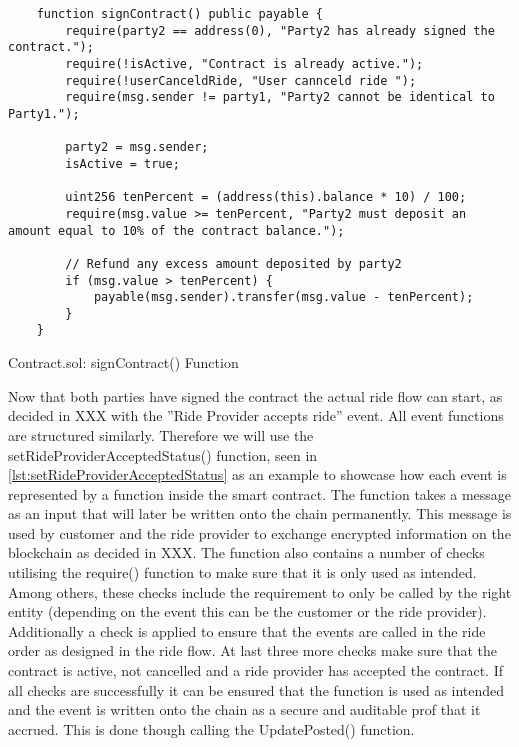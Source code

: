 \begin{Listing}
\begin{lstlisting}
    function signContract() public payable {
        require(party2 == address(0), "Party2 has already signed the contract.");
        require(!isActive, "Contract is already active.");
        require(!userCanceldRide, "User cannceld ride ");
        require(msg.sender != party1, "Party2 cannot be identical to Party1.");
        
        party2 = msg.sender;
        isActive = true;

        uint256 tenPercent = (address(this).balance * 10) / 100;
        require(msg.value >= tenPercent, "Party2 must deposit an amount equal to 10% of the contract balance.");

        // Refund any excess amount deposited by party2
        if (msg.value > tenPercent) {
            payable(msg.sender).transfer(msg.value - tenPercent);
        }
    }
\end{lstlisting}
  \caption{Contract.sol: signContract() Function}
  \label{lst:signContract}
\end{Listing}

Now that both parties have signed the contract the actual ride flow can start, as decided in XXX with the ''Ride Provider accepts ride'' event. All event functions are structured similarly. Therefore we will use the setRideProviderAcceptedStatus() function, seen in \ref{lst:setRideProviderAcceptedStatus} as an example to showcase how each event is represented by a function inside the smart contract. The function takes a message as an input that will later be written onto the chain permanently. This message is used by customer and the ride provider to exchange encrypted information on the blockchain as decided in XXX. The function also contains a number of checks utilising the require() function to make sure that it is only used as intended. Among others, these checks include the requirement to only be called by the right entity (depending on the event this can be the customer or the ride provider). Additionally a check is applied to ensure that the events are called in the ride order as designed in the ride flow. At last three more checks make sure that the contract is active, not cancelled and a ride provider has accepted the contract. If all checks are successfully it can be ensured that the function is used as intended and the event is written onto the chain as a secure and auditable prof that it accrued. This is done though calling the UpdatePosted() function.

